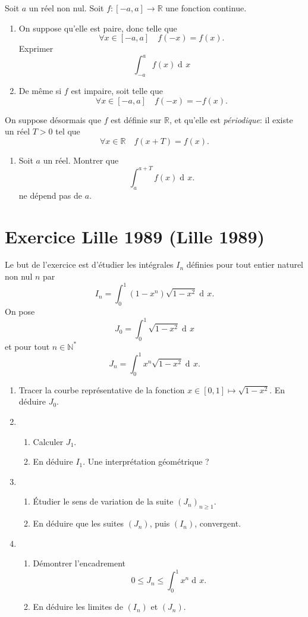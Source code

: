 \documentclass{article}
\makeatletter
\newcommand{\NN}{\mathbb N}
\newcommand{\RR}{\mathbb R}
\DeclareMathOperator{\dif}{\mathrm{d}\!}
\newcounter{Exercice}
\newcommand{\exercice}[1][\@nil]{\refstepcounter{Exercice}
	\section*{Exercice \theExercice
	\def\tmp{#1}
	\ifx\tmp\@nnil
	\else
	(#1)
	\fi
}}
\makeatother
\begin{document}
Soit $a$ un réel non nul.
Soit $f\colon[-a,a]\longrightarrow\RR$ une fonction continue.

\begin{enumerate}
	\item On suppose qu'elle est paire, donc telle que
	\[
	\forall x\in[-a,a]\quad f(-x) = f(x).
	\]
	Exprimer
	\[
	\int_{-a}^{a} f(x)\dif x
	\]
	\item De même si $f$ est impaire, soit telle que
	\[
	\forall x\in[-a,a]\quad f(-x) = -f(x).
	\]
\end{enumerate}

On suppose désormais que $f$ est définie sur $\RR$, et qu'elle est \textit{périodique}: il existe un réel $T > 0$ tel que
\[
\forall x\in\RR\quad f(x+T) = f(x).
\]
\begin{enumerate}[resume]
	\item Soit $a$ un réel. Montrer que
	\[
	\int_{a}^{a+T} f(x)\dif x.
	\]
	ne dépend pas de $a$.
\end{enumerate}


\exercice[Lille 1989]

Le but de l'exercice est d'étudier les intégrales $I_n$ définies pour tout entier naturel non nul $n$ par
\[
I_n = \int_0^1 (1-x^n)\sqrt{1-x^2}\dif x.
\]
On pose
\[
J_0 = \int_0^1 \sqrt{1-x^2}\dif x
\]
et pour tout $n\in\NN^*$
\[
J_n = \int_0^1 x^n\sqrt{1-x^2}\dif x.
\]

\begin{enumerate}
	\item Tracer la courbe représentative de la fonction $x\in[0,1]\longmapsto \sqrt{1-x^2}$. En déduire $J_0$.
	\item \begin{enumerate}
		\item Calculer $J_1$.
		\item En déduire $I_1$. Une interprétation géométrique ?
	\end{enumerate}
	\item \begin{enumerate}
		\item Étudier le sens de variation de la suite $(J_n)_{n\geq 1}$.
		\item En déduire que les suites $(J_n)$, puis $(I_n)$, convergent.
	\end{enumerate}
	\item \begin{enumerate}
		\item Démontrer l'encadrement
		\[
		0 \leq J_n \leq \int_0^1 x^n\dif x.
		\]
		\item En déduire les limites de $(I_n)$ et $(J_n)$.
	\end{enumerate}
\end{enumerate}
\end{document}

